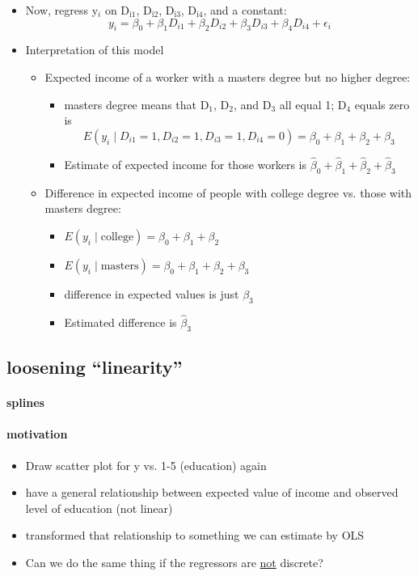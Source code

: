 \begin{itemize}
\item Now, regress y$_i$ on D$_{\mathrm{i1}}$, D$_{\mathrm{i2}}$, D$_{\mathrm{i3}}$, D$_{\mathrm{i4}}$, and a constant:
        \[ y_i = \beta_0 + \beta_1 D_{i1} + \beta_2 D_{i2} + \beta_3
        D_{i3} + \beta_4 D_{i4} + \epsilon_i \]
\item Interpretation of this model
\begin{itemize}
\item Expected income of a worker with a masters degree but no
          higher degree:
\begin{itemize}
\item masters degree means that D$_1$, D$_2$, and D$_3$ all equal 1;
            D$_4$ equals zero is
            \[ E(y_i \mid D_{i1}=1,D_{i2}=1,D_{i3}=1,D_{i4}=0) =
            \beta_0 + \beta_1 + \beta_2 + \beta_3 \]
\item Estimate of expected income for those workers is $\hat
            \beta_0 + \hat\beta_1 + \hat\beta_2 + \hat\beta_3$
\end{itemize}
\item Difference in expected income of people with college degree
          vs. those with masters degree:
\begin{itemize}
\item $E(y_i \mid \text{college}) = \beta_0 + \beta_1 + \beta_2$
\item $E(y_i \mid \text{masters}) = \beta_0 + \beta_1 +
            \beta_2 + \beta_3$
\item difference in expected values is just $\beta_3$
\item Estimated difference is $\hat\beta_3$
\end{itemize}
\end{itemize}
\end{itemize}
\subsection{loosening ``linearity''}
\label{sec-1-3}
\paragraph{splines}
\label{sec-1-3-1}
\paragraph{motivation}
\label{sec-1-3-1-1}

\begin{itemize}
\item Draw scatter plot for y vs. 1-5 (education) again
\item have a general relationship between expected value of income
         and observed level of education (not linear)
\item transformed that relationship to something we can estimate by
         OLS
\item Can we do the same thing if the regressors are \underline{not}
         discrete?
\end{itemize}

